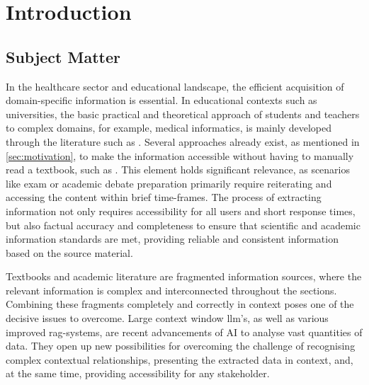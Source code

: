 \chapter{Introduction}\label{ch:introduction}
\section{Subject Matter}\label{sec:subject matter}
In the healthcare sector and educational landscape, the efficient acquisition of domain-specific information is essential. 
In educational contexts such as universities, the basic practical and theoretical approach of students and teachers to complex domains, for example, medical informatics, is mainly developed through the literature such as \citet{bb2}.
%
Several approaches already exist, as mentioned in \cref{sec:motivation}, to make the information accessible without having to manually read a textbook, such as \citet{bb2}.
This element holds significant relevance, as scenarios like exam or academic debate preparation primarily require reiterating and accessing the content within brief time-frames.
%
The process of extracting information not only requires accessibility for all users and short response times, but also factual accuracy and completeness to ensure that scientific and academic information standards are met, providing reliable and consistent information based on the source material.
 
Textbooks and academic literature are fragmented information sources, where the relevant information is complex and interconnected throughout the sections. 
Combining these fragments completely and correctly in context poses one of the decisive issues to overcome. 
%
Large context window \ac{llm}'s, as well as various improved \ac{rag}-systems, are recent advancements of AI to analyse vast quantities of data.
They open up new possibilities for overcoming the challenge of recognising complex contextual relationships, presenting the extracted data in context, and, at the same time, providing accessibility for any stakeholder.

